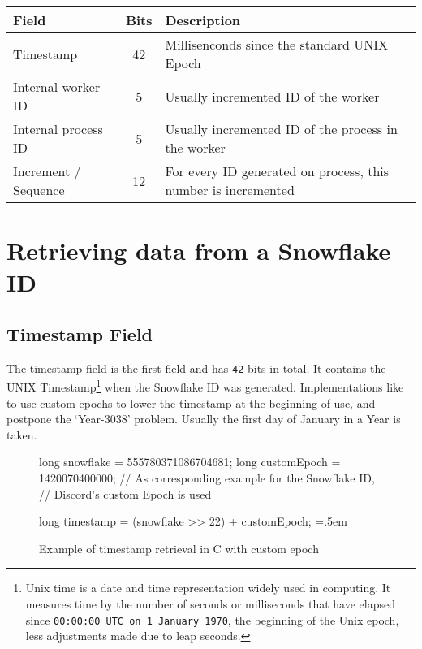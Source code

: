 \documentclass{article}
\newcommand{\code}[1]{\colorbox{cverbbg}{\texttt{#1}}}
\newenvironment{lcverbatim}
{\SaveVerbatim{cverb}}
{\endSaveVerbatim{}
    \flushleft\fboxrule=0pt\fboxsep=.5em
    \colorbox{cverbbg}{%

        \makebox[\dimexpr\linewidth-2\fboxsep][l]{\BUseVerbatim{cverb}}%
    }
    \endflushleft{}
}
\begin{document}
\begin{table}[h]
    \begin{tabular}{l|c|l}
        Field                & Bits           & Description
        \\ \hline
        Timestamp            & \color{cyan}42 & Millisenconds since the
        standard UNIX Epoch
        \\ \hline
        Internal worker ID   & \color{red}5   & Usually incremented ID of the
        worker
        \\ \hline
        Internal process ID  & \color{green}5 & Usually incremented ID of the
        process in
        the worker
        \\ \hline
        Increment / Sequence & \color{gray}12 & For every ID generated on
        process, this number is incremented
    \end{tabular}
\end{table}

\pagebreak

\section{Retrieving data from a Snowflake ID}

\subsection{Timestamp Field}
The timestamp field is the first field and has \code{42} bits in total. It
contains the UNIX Timestamp\footnote{Unix time is a date and time
    representation widely used in computing. It measures time by the number of
    seconds or milliseconds that have elapsed since \texttt{00:00:00 UTC on 1
        January 1970}, the beginning of the Unix epoch, less adjustments made
    due to
    leap seconds.} when the Snowflake ID was generated. Implementations like to
use
custom epochs to lower the timestamp at the beginning of use, and postpone the
`Year-3038' problem. Usually the first day of January in a Year is taken.

\begin{figure}[H]
    \begin{lcverbatim}
        long snowflake = 555780371086704681;
        long customEpoch = 1420070400000;
        // As corresponding example for the Snowflake ID,
        // Discord's custom Epoch is used

        long timestamp = (snowflake >> 22) + customEpoch;
    \end{lcverbatim}
    \caption{Example of timestamp retrieval in C with custom
        epoch}\label{fig:r_timestamp_1}
\end{figure}
\end{document}
